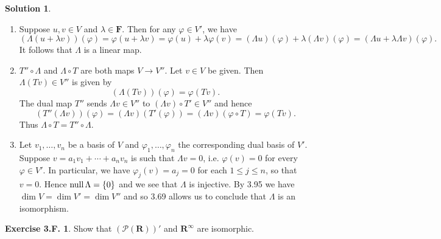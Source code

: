 \documentclass[12pt]{article}
\theoremstyle{definition}
\theoremstyle{exercise}
\newtheorem{exercise}{Exercise 3.F.}
\theoremstyle{solution}
\newtheorem*{solution}{Solution}
\newcommand{\poly}{\mathcal{P}}
\newcommand{\Null}{\text{null\,}}
\newcommand{\R}{\mathbf{R}}
\newcommand{\F}{\mathbf{F}}
\begin{document}
\begin{solution}
    \begin{enumerate}
        \item Suppose \( u, v \in V \) and \( \lambda \in \F \). Then for any \( \varphi \in V' \), we have
        \[
            (\Lambda(u + \lambda v))(\varphi) = \varphi(u + \lambda v) = \varphi(u) + \lambda \varphi(v) = (\Lambda u)(\varphi) + \lambda (\Lambda v)(\varphi) = (\Lambda u + \lambda \Lambda v)(\varphi).
        \]
        It follows that \( \Lambda \) is a linear map.

        \item \( T'' \circ \Lambda \) and \( \Lambda \circ T \) are both maps \( V \to V'' \). Let \( v \in V \) be given. Then \( \Lambda(Tv) \in V'' \) is given by
        \[
            (\Lambda(Tv))(\varphi) = \varphi(Tv).
        \]
        The dual map \( T'' \) sends \( \Lambda v \in V'' \) to \( (\Lambda v) \circ T' \in V'' \) and hence
        \[
            (T''(\Lambda v))(\varphi) = (\Lambda v)(T'(\varphi)) = (\Lambda v)(\varphi \circ T) = \varphi(Tv).
        \]
        Thus \( \Lambda \circ T = T'' \circ \Lambda \).

        \item Let \( v_1, \ldots, v_n \) be a basis of \( V \) and \( \varphi_1, \ldots, \varphi_n \) the corresponding dual basis of \( V' \). Suppose \( v = a_1 v_1 + \cdots + a_n v_n \) is such that \( \Lambda v = 0 \), i.e. \( \varphi(v) = 0 \) for every \( \varphi \in V' \). In particular, we have \( \varphi_j(v) = a_j = 0 \) for each \( 1 \leq j \leq n \), so that \( v = 0 \). Hence \( \Null \Lambda = \{ 0 \} \) and we see that \( \Lambda \) is injective. By 3.95 we have \( \dim V = \dim V' = \dim V'' \) and so 3.69 allows us to conclude that \( \Lambda \) is an isomorphism.
    \end{enumerate}
\end{solution}

\begin{exercise}
\label{ex:35}
    Show that \( (\poly(\R))' \) and \( \R^{\infty} \) are isomorphic.
\end{exercise}
\end{document}
